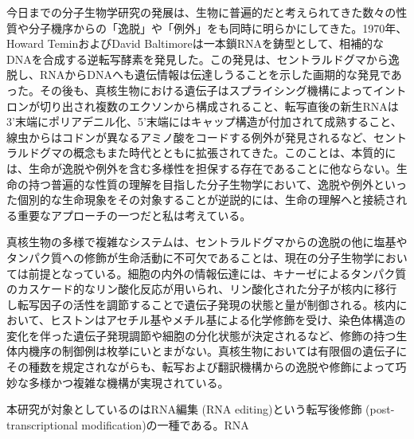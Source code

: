 今日までの分子生物学研究の発展は、生物に普遍的だと考えられてきた数々の性質や分子機序からの「逸脱」や「例外」をも同時に明らかにしてきた。1970年、Howard TeminおよびDavid Baltimoreは一本鎖RNAを鋳型として、相補的なDNAを合成する逆転写酵素を発見した。この発見は、セントラルドグマから逸脱し、RNAからDNAへも遺伝情報は伝達しうることを示した画期的な発見であった。その後も、真核生物における遺伝子はスプライシング機構によってイントロンが切り出され複数のエクソンから構成されること、転写直後の新生RNAは3'末端にポリアデニル化、5'末端にはキャップ構造が付加されて成熟すること、線虫からはコドンが異なるアミノ酸をコードする例外が発見されるなど、セントラルドグマの概念もまた時代とともに拡張されてきた。このことは、本質的には、生命が逸脱や例外を含む多様性を担保する存在であることに他ならない。生命の持つ普遍的な性質の理解を目指した分子生物学において、逸脱や例外といった個別的な生命現象をその対象することが逆説的には、生命の理解へと接続される重要なアプローチの一つだと私は考えている。
\par
真核生物の多様で複雑なシステムは、セントラルドグマからの逸脱の他に塩基やタンパク質への修飾が生命活動に不可欠であることは、現在の分子生物学においては前提となっている。細胞の内外の情報伝達には、キナーゼによるタンパク質のカスケード的なリン酸化反応が用いられ、リン酸化された分子が核内に移行し転写因子の活性を調節することで遺伝子発現の状態と量が制御される。核内において、ヒストンはアセチル基やメチル基による化学修飾を受け、染色体構造の変化を伴った遺伝子発現調節や細胞の分化状態が決定されるなど、修飾の持つ生体内機序の制御例は枚挙にいとまがない。真核生物においては有限個の遺伝子にその種数を規定されながらも、転写および翻訳機構からの逸脱や修飾によって巧妙な多様かつ複雑な機構が実現されている。
\par
本研究が対象としているのはRNA編集 (RNA editing)という転写後修飾 (post-transcriptional modification)の一種である。RNA 
